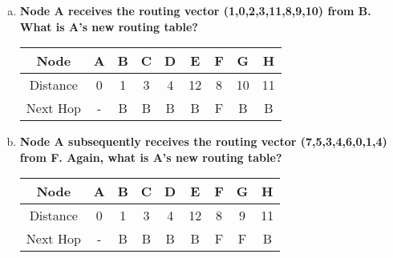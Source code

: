 \documentclass[11pt]{article}
\begin{document}
\begin{enumerate}[1.]
\begin{enumerate}[a.]
  \item \textbf{Node A receives the routing vector (1,0,2,3,11,8,9,10) from B. What is A's new routing table?}

    \begin{tabular}{|c|c|c|c|c|c|c|c|c|}
      \hline
      Node &      A & B & C & D & E & F & G & H \\
      \hline
      Distance &  0 & 1 & 3 & 4 & 12 & 8 & 10 & 11 \\
      \hline
      Next Hop &  - & B & B & B & B & F & B & B \\
      \hline
    \end{tabular}

  \item \textbf{ Node A subsequently receives the routing vector (7,5,3,4,6,0,1,4) from F. Again, what is A's new routing table? }

    \begin{tabular}{|c|c|c|c|c|c|c|c|c|}
      \hline
      Node &      A & B & C & D & E & F & G & H \\
      \hline
      Distance &  0 & 1 & 3 & 4 & 12 & 8 & 9 & 11 \\
      \hline
      Next Hop &  - & B & B & B & B & F & F & B \\
      \hline
    \end{tabular}
  \end{enumerate}
\end{enumerate}
\end{document}
